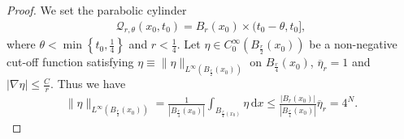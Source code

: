 \documentclass[reqno,10pt]{amsart}
\numberwithin{equation}{section}
\begin{document}
\begin{proof}
	We set the parabolic cylinder
	\begin{align}
		\mathcal{Q}_{r,\theta}(x_0,t_0)=B_r(x_0)\times(t_0-\theta,t_0],
	\end{align}
	where $\theta<\min\left\lbrace t_0,\frac{1}{4}\right\rbrace $ and $r<\frac{1}{4}$. Let $\eta\in C^{\infty}_0\left( B_{\frac{r}{2}}(x_0)\right) $ be a non-negative cut-off function satisfying $\eta\equiv\|\eta\|_{L^\infty\left( B_{\frac{r}{2}}(x_0)\right)}$ on $B_{\frac{r}{4}}(x_0)$, $\overline{\eta}_r=1$ and $|\nabla\eta|\le\frac{C}{r}$. Thus we have
	\begin{align*}
		\|\eta\|_{L^\infty\left( B_{\frac{r}{2}}(x_0)\right)}=\frac{1}{\left|B_{\frac{r}{4}}(x_0)\right|}\int_{B_{\frac{r}{4}(x_0)}}\eta\,\mathrm{d}x\le\frac{\left|B_{r}(x_0)\right|}{\left| B_{\frac{r}{4}}(x_0)\right|}\overline{\eta}_r=4^N.
	\end{align*}
	

\end{proof}
\end{document}
